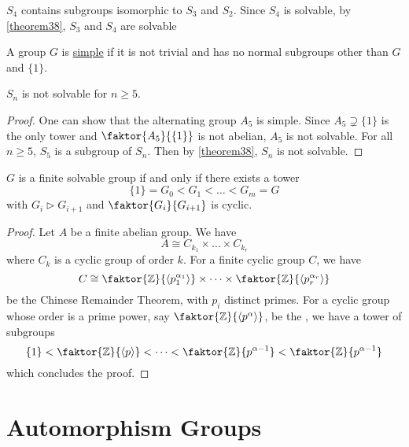 \documentclass[11pt]{article}
\newcommand{\cyclic}[1]{\left\langle #1 \right\rangle}
\newcommand{\quotient}[2]{\faktor{#1}{#2}}
\begin{document}
\begin{example}
$S_4$ contains subgroups isomorphic to $S_3$ and $S_2$. Since $S_4$ is solvable,
by \cref{theorem38}, $S_3$ and $S_4$ are solvable
\end{example}
\begin{definition}
A group $G$ is \underline{simple} if it is not trivial and has no normal
subgroups other than $G$ and $\{1\}$.
\end{definition}
\begin{remark}
$S_n$ is not solvable for $n \geq 5$.
\end{remark}
\begin{proof}
One can show that the alternating group $A_5$ is simple. Since $A_5 \supsetneq
\{1\}$ is the only tower and $\quotient{A_5}{\{1\}}$ is not abelian, $A_5$
is not solvable. For all $n \geq 5$, $S_5$ is a subgroup of $S_n$. Then by
\cref{theorem38}, $S_n$ is not solvable.
\end{proof}
\begin{corollary}
$G$ is a finite solvable group if and only if there exists a tower
\begin{equation*}
\{1\} = G_0 < G_1 < \dots < G_m = G
\end{equation*}
with $G_{i} \triangleright G_{i+1}$ and $\quotient{G_i}{G_{i+1}}$ is cyclic.
\label{corollary39}
\end{corollary}
\begin{proof}
Let $A$ be a finite abelian group. We have
\begin{equation*}
A \cong C_{k_1} \times \dots \times C_{k_r} 
\end{equation*}
where $C_k$ is a cyclic group of order $k$. For a finite cyclic group $C$, we
have
\begin{equation*}
C \cong \quotient{\Z}{\cyclic{p_1^{\alpha_1}}} \times \dots \times
\quotient{\Z}{\cyclic{p_r^{\alpha_r}}}
\end{equation*}
be the Chinese Remainder Theorem, with $p_i$ distinct primes. For a cyclic group
whose order is a prime power, say $\quotient{\Z}{\cyclic{p^\alpha}}$, be the
, we have a tower of subgroups
\begin{equation*}
\{1\} < \quotient{\Z}{\cyclic{p}} < \dots < \quotient{\Z}{p^{\alpha-1}} <
\quotient{\Z}{p^{\alpha-1}}
\end{equation*}
which concludes the proof.
\end{proof}

\pagebreak
\section{Automorphism Groups}
\end{document}
